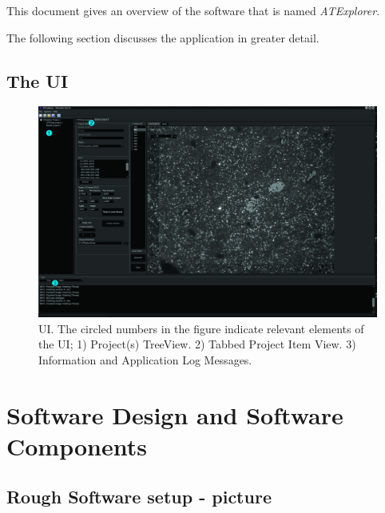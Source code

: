 \documentclass[11pt,fleqn]{book} %
\begin{document}
\doublespacing
This document gives an overview of the software that is named \emph{ATExplorer}.

The following section discusses the application in greater detail.

\clearpage

\section{The \ate UI}

\begin{figure}[h]
\centering\includegraphics[scale=0.85]{ATExplorerUI_1}
\caption{\ate{} UI. The circled numbers in the figure indicate relevant elements of the UI; 1) Project(s) TreeView. 2) Tabbed Project Item View. 3) Information and Application Log Messages.}
\end{figure}

\clearpage


\chapter{Software Design and Software Components}
\section{Rough Software setup - picture}
\end{document}

